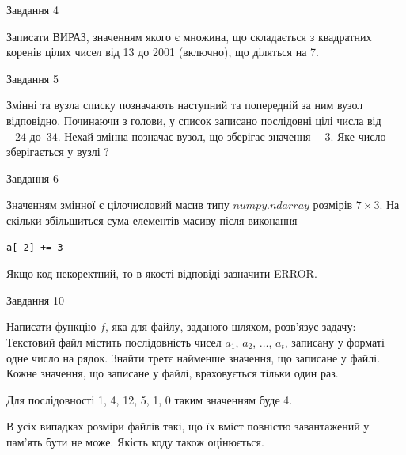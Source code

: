 \documentclass[12pt, ukrainian]{article}
\begin{document}
{               
{\begin{center}Завдання {4}\end{center}}
\vspace{-6mm}
Записати ВИРАЗ, значенням якого є множина, що складається з квадратних корен\-ів цілих чисел від 13 до 2001 (включно), що діляться на 7.\par

\vspace{10mm}
               
{\begin{center}Завдання {5}\end{center}}
\vspace{-6mm}
Змінні  та  вузла списку позначають наступний та попередній за ним вузол відповідно. Починаючи з голови, у список записано послідовні цілі числа від~$-24$ до~$34$. Нехай змінна  позначає вузол, що зберігає значення~$-3$.
Яке число зберігається у вузлі  ?\par

               
{\begin{center}Завдання {6}\end{center}}
\vspace{-6mm}
Значенням змінної  є цілочисловий масив типу $numpy.ndarray$ розмірів $7{\times}3$. На скільки збільшиться сума елементів масиву  після виконання
\begin{verbatim}
a[-2] += 3
\end{verbatim}


Якщо код некоректний, то в якості відповіді зазначити ERROR.\par

               
{\begin{center}Завдання {10}\end{center}}
\vspace{-6mm}

Написати функцію $f$, яка для файлу, заданого шляхом, розв’язує задачу:\\ Текстовий файл містить послідовність чисел $a_1$, $a_2$, $\ldots$, $a_t$, записану у форматі одне число на рядок. Знайти третє найменше значення, що записане у файлі. Кожне значення, що записане у файлі, враховується тільки один раз. \par
Для послідовності 1, 4, 12, 5, 1, 0 таким значенням буде 4.

В усіх випадках розміри файлів такі, що їх вміст повністю завантажений у пам'ять бути не може. Якість коду також оцінюється.



}
\end{document}
